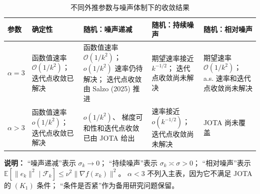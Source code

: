 \documentclass[11pt]{ctexart}
\begin{document}
\begin{table}[htbp]
    \centering
    \small
    \renewcommand{\arraystretch}{1.35}
    \caption{不同外推参数与噪声体制下的收敛结果}
    \label{tab:alpha-noise-regimes}

    \begin{tabularx}{\textwidth}{
        @{}
        >{\centering\arraybackslash}p{1.2cm}
        >{\raggedright\arraybackslash}X
        >{\raggedright\arraybackslash}X
        >{\raggedright\arraybackslash}X
        >{\raggedright\arraybackslash}X
        @{}
    }
        \toprule
        参数
        & 确定性
        & 随机：噪声递减
        & 随机：持续噪声
        & 随机：相对噪声 \\
        \midrule

        $\alpha=3$
        &
        函数值速率
        $\mathcal{O}(1/k^2)$；
        迭代点收敛已解决
        &
        函数值速率
        $\mathcal{O}(1/k^2)$；
        $o(1/k^2)$ 速率仍待解决；
        迭代点收敛由 Salzo (2025) 推进
        &
        期望速率接近
        $k^{-1/2}$；
        迭代点收敛尚未解决
        &
        期望速率
        $\mathcal{O}(1/k^2)$；
        a.s. 速率和迭代点收敛尚未解决
        \\

        $\alpha>3$
        &
        函数值速率
        $o(1/k^2)$；
        迭代点收敛已解决
        &
        $o(1/k^2)$、
        梯度可和性和迭代点收敛
        已由 JOTA 给出
        &
        速率接近
        $o(k^{-1/2})$；
        迭代点收敛尚未解决
        &
        JOTA 尚未覆盖
        \\

        \bottomrule
    \end{tabularx}

    \vspace{2mm}

    \begin{minipage}{0.96\textwidth}
        \footnotesize
        \textbf{说明：}
        “噪声递减”表示 $\sigma_k\to0$；
        “持续噪声”表示 $\sigma_k\asymp\sigma>0$；
        “相对噪声”表示
        $\mathbb{E}[\|e_k\|^2\mid\mathcal{F}_k]
        \le \nu^2\|\nabla f(x_k)\|^2$。
        $\alpha<3$ 不列入主表，因为它不满足 JOTA 的 $(K_1)$ 条件；
        “条件是否紧”作为备用研究问题保留。
    \end{minipage}
\end{table}



\end{document}
